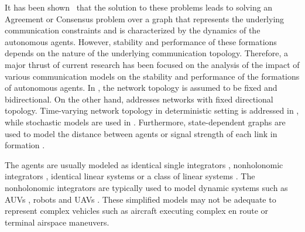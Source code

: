\documentclass[letter,onecolumn,12pt]{aiaa-tc}
\newcommand{\1}{1_n}
\begin{document}
It has been shown~\cite{jadbabaie03,tanner05,saber07} that the solution to these
problems leads to solving an Agreement or Consensus problem over a graph that represents the underlying communication
constraints and is characterized by the dynamics of the autonomous agents. However, stability and
performance of these formations depends on the nature of the underlying communication topology.  Therefore, a major thrust of current research has been focused on the analysis of the impact of various communication models on the stability and performance of the formations of autonomous agents. In \cite{fax04}, the network topology is assumed to be fixed and bidirectional. On the other hand, \cite{Francis-directed} addresses networks with fixed directional topology. Time-varying network topology in deterministic setting is addressed in \cite{jadbabaie03,Moreau,lin05}, while  stochastic models are used in \cite{mesbahi, Stilwell, Stilwell2}. Furthermore, state-dependent graphs are used to model the distance between agents or signal strength of each link in formation \cite{mesbahi}.

The agents are usually modeled as identical single integrators \cite{jadbabaie03,Moreau},  nonholonomic integrators
\cite{ Francis-directed,beard:coop-book,Leonard}, identical linear systems \cite{fax04} or a class of linear systems
\cite{dandrea}. The nonholonomic integrators are typically used to model dynamic systems such as AUVs \cite{Leonard},
robots \cite{Francis-directed,lin05} and UAVs \cite{mclain,beard:coop-book}. These simplified models may not
be adequate to represent complex vehicles such as aircraft executing complex en route or terminal airspace maneuvers.
\end{document}
